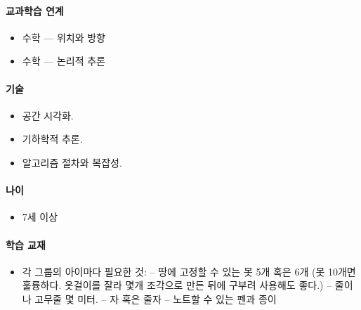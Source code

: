 \documentclass[]{article}
\begin{document}
\mbox{}\paragraph{교과학습 연계}\label{section-211}

\begin{itemize}
\itemsep1pt\parskip0pt
\item
  수학 --- 위치와 방향
\item
  수학 --- 논리적 추론
\end{itemize}

\mbox{}\paragraph{기술}\label{section-212}

\begin{itemize}
\itemsep1pt\parskip0pt
\item
  공간 시각화.
\item
  기하학적 추론.
\item
  알고리즘 절차와 복잡성.
\end{itemize}

\mbox{}\paragraph{나이}\label{section-213}

\begin{itemize}
\itemsep1pt\parskip0pt
\item
  7세 이상
\end{itemize}

\mbox{}\paragraph{학습 교재}\label{section-214}

\begin{itemize}
\itemsep1pt\parskip0pt
\item
  각 그룹의 아이마다 필요한 것: -- 땅에 고정할 수 있는 못 5개 혹은 6개
  (못 10개면 훌륭하다. 옷걸이를 잘라 몇개 조각으로 만든 뒤에 구부려
  사용해도 좋다.) -- 줄이나 고무줄 몇 미터. -- 자 혹은 줄자 -- 노트할 수
  있는 펜과 종이
\end{itemize}

\end{document}

